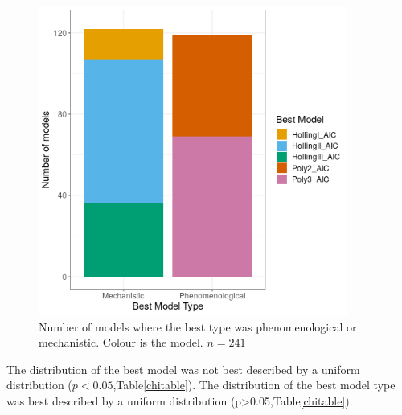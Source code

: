 \documentclass{article}
\begin{document}
\begin{figure}[h!t] 
    \centering
    \includegraphics[width=4in]{../Results/Plots/modelbesttype.png}
    \caption{Number of models where the best type was phenomenological or mechanistic. Colour is the model. $n=241$}
    \label{fig:modelbesttype}
\end{figure}
The distribution of the best model was not best described by a uniform distribution ($p<0.05$,Table\ref{chitable}).  The distribution of the best model type was best described by a uniform distribution (p>0.05,Table\ref{chitable}).
\clearpage

\end{document}
